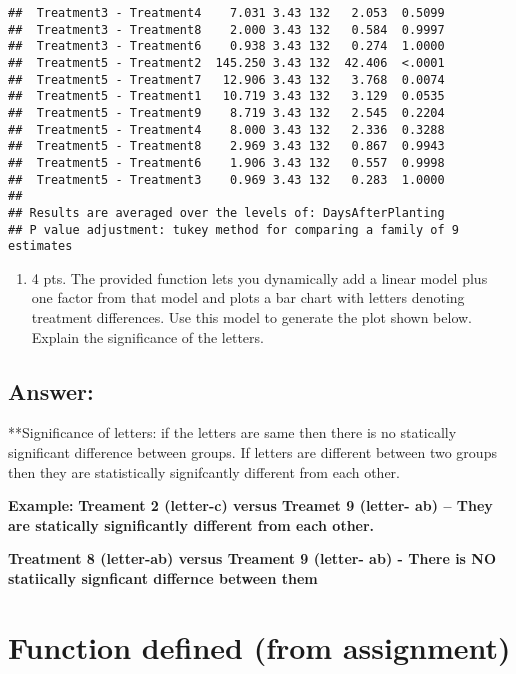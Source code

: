\documentclass[
]{article}
\providecommand{\tightlist}{%
  \setlength{\itemsep}{0pt}\setlength{\parskip}{0pt}}
\begin{document}
\begin{verbatim}
##  Treatment3 - Treatment4    7.031 3.43 132   2.053  0.5099
##  Treatment3 - Treatment8    2.000 3.43 132   0.584  0.9997
##  Treatment3 - Treatment6    0.938 3.43 132   0.274  1.0000
##  Treatment5 - Treatment2  145.250 3.43 132  42.406  <.0001
##  Treatment5 - Treatment7   12.906 3.43 132   3.768  0.0074
##  Treatment5 - Treatment1   10.719 3.43 132   3.129  0.0535
##  Treatment5 - Treatment9    8.719 3.43 132   2.545  0.2204
##  Treatment5 - Treatment4    8.000 3.43 132   2.336  0.3288
##  Treatment5 - Treatment8    2.969 3.43 132   0.867  0.9943
##  Treatment5 - Treatment6    1.906 3.43 132   0.557  0.9998
##  Treatment5 - Treatment3    0.969 3.43 132   0.283  1.0000
## 
## Results are averaged over the levels of: DaysAfterPlanting 
## P value adjustment: tukey method for comparing a family of 9 estimates
\end{verbatim}

\begin{enumerate}
\def\labelenumi{\arabic{enumi}.}
\setcounter{enumi}{4}
\tightlist
\item
  4 pts. The provided function lets you dynamically add a linear model
  plus one factor from that model and plots a bar chart with letters
  denoting treatment differences. Use this model to generate the plot
  shown below. Explain the significance of the letters.
\end{enumerate}

\subsection{Answer:}\label{answer-2}

**Significance of letters: if the letters are same then there is no
statically significant difference between groups. If letters are
different between two groups then they are statistically signifcantly
different from each other.

\textbf{Example:} \textbf{Treament 2 (letter-c) versus Treamet 9
(letter- ab) -- They are statically significantly different from each
other.}

\textbf{Treatment 8 (letter-ab) versus Treament 9 (letter- ab) - There
is NO statiically signficant differnce between them}

\section{Function defined (from
assignment)}\label{function-defined-from-assignment}
\end{document}
